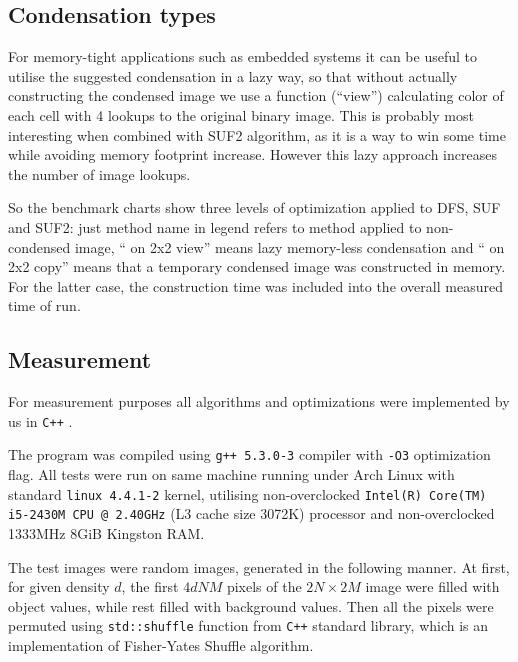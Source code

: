 \documentclass[hidelinks]{llncs}
\newcommand{\texten}[1]{#1}
\newcommand{\textru}[1]{}
\newcommand{\CXX}{\texttt{C++} \xspace}
\begin{document}
\subsection{Condensation types}

\texten{
For memory-tight applications such as embedded systems it can be useful to
utilise the suggested condensation in a lazy way, so that without actually
constructing the condensed image we use a function (``view'') calculating color of
each cell with 4 lookups to the original binary image.
This is probably most interesting when combined with SUF2 algorithm, as it is a way
to win some time while avoiding memory footprint increase.
However this lazy approach increases the number of image lookups.
}\textru{
В некоторых случаях может быть более приемлемо использовать сжатие неявно, то
есть вместо построения 
}

So the benchmark charts show three levels of optimization applied to DFS, SUF
and SUF2: just method name in legend refers to method applied to non-condensed
image, `` on 2x2 view'' means lazy memory-less condensation and `` on 2x2 copy''
means that a temporary condensed image was constructed in memory. For the latter
case, the construction time was included into the overall measured time of run.

\subsection{Measurement}

For measurement purposes all algorithms and optimizations were implemented by us in \CXX.

The program was compiled using \texttt{g++ 5.3.0-3} compiler with \texttt{-O3}
optimization flag. All tests were run on same machine running under Arch Linux
with standard \texttt{linux 4.4.1-2} kernel, utilising non-overclocked
\texttt{Intel(R) Core(TM) i5-2430M CPU @ 2.40GHz} (L3 cache size 3072K)
processor and non-overclocked 1333MHz 8GiB Kingston RAM.

The test images were random images, generated in the following manner. At first,
for given density $d$, the first $4dNM$ pixels of the $2N \times 2M$ image were
filled with object values, while rest filled with background values. Then all
the pixels were permuted using \texttt{std::shuffle} function from \CXX standard
library, which is an implementation of Fisher-Yates Shuffle algorithm.
\end{document}
